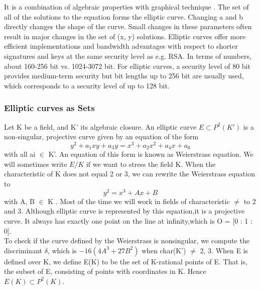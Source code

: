 \documentclass{article}
\begin{document}
  It is a combination of algebraic properties with graphical technique .
The set of all of the solutions to the equation forms the elliptic curve. Changing a and b directly changes the shape of the curve. Small changes in these parameters often result in major changes in the set of (x, y) solutions.
    Elliptic curves offer more efficient implementations and bandwidth advantages with respect to shorter signatures and keys at the same security level as e.g. RSA. In terms of numbers, about 160-256 bit vs. 1024-3072 bit. For elliptic curves, a security level of 80 bit provides medium-term security but bit lengths up to 256 bit are usually used, which corresponds to a security level of up to
128 bit.
\subsubsection{Elliptic curves as Sets}
Let K be a field, and K' its algebraic closure. An elliptic curve $E \subset P^2(K')$ is a non-singular, projective curve given by an equation of the form
$$y^2+a_1xy + a_3y = x^3 + a_2x^2 + a_4x + a_6$$
with all ai $\in$ K'. An equation of this form is known as Weierstrass equation. 
 We will sometimes write $E/K$ if we want to stress the field K.
When the characteristic of K does not equal 2 or 3, we can rewrite the Weierstrass equation to
$$y^2 = x^3 + Ax + B$$
with A, B $\in$ K . Most of the time we will work in fields of characteristic $\neq$ to 2 and 3.
Although elliptic curve is represented by this equation,it is a projective curve. It always has exactly one point on the line at infinity,which is O = [0 : 1 : 0].\\
To check if the curve defined by the Weierstrass is nonsingular, we compute the discriminant $\delta$, which is $−16(4A^3 + 27B^2)$ when char(K') $\neq$ 2, 3. When E is defined over K, we define E(K) to be the set of K-rational points of E. That is, the subset of E, consisting of points with coordinates in K. Hence $E(K) \subset P^2(K).$
\end{document}
